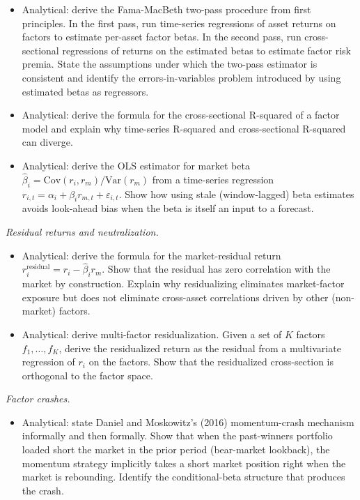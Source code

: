 \begin{itemize}
\tightlist
\item
  Analytical: derive the Fama-MacBeth two-pass procedure from first
  principles. In the first pass, run time-series regressions of asset
  returns on factors to estimate per-asset factor betas. In the second
  pass, run cross-sectional regressions of returns on the estimated
  betas to estimate factor risk premia. State the assumptions under
  which the two-pass estimator is consistent and identify the
  errors-in-variables problem introduced by using estimated betas as
  regressors.
\item
  Analytical: derive the formula for the cross-sectional R-squared of a
  factor model and explain why time-series R-squared and cross-sectional
  R-squared can diverge.
\item
  Analytical: derive the OLS estimator for market beta
  \(\hat{\beta}_i = \text{Cov}(r_i, r_m) / \text{Var}(r_m)\) from a
  time-series regression
  \(r_{i,t} = \alpha_i + \beta_i r_{m,t} + \varepsilon_{i,t}\). Show how
  using stale (window-lagged) beta estimates avoids look-ahead bias when
  the beta is itself an input to a forecast.
\end{itemize}

\emph{Residual returns and neutralization.}

\begin{itemize}
\tightlist
\item
  Analytical: derive the formula for the market-residual return
  \(r_i^{\text{residual}} = r_i - \hat{\beta}_i r_m\). Show that the
  residual has zero correlation with the market by construction. Explain
  why residualizing eliminates market-factor exposure but does not
  eliminate cross-asset correlations driven by other (non-market)
  factors.
\item
  Analytical: derive multi-factor residualization. Given a set of \(K\)
  factors \(f_1, \ldots, f_K\), derive the residualized return as the
  residual from a multivariate regression of \(r_i\) on the factors.
  Show that the residualized cross-section is orthogonal to the factor
  space.
\end{itemize}

\emph{Factor crashes.}

\begin{itemize}
\tightlist
\item
  Analytical: state Daniel and Moskowitz's (2016) momentum-crash
  mechanism informally and then formally. Show that when the
  past-winners portfolio loaded short the market in the prior period
  (bear-market lookback), the momentum strategy implicitly takes a short
  market position right when the market is rebounding. Identify the
  conditional-beta structure that produces the crash.
\end{itemize}

